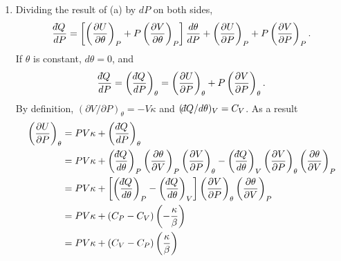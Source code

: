 \documentclass[a4paper,12pt]{article}
\def\dbar{{\mathchar'26\mkern-12mu d}}
\begin{document}
\begin{enumerate}
\begin{enumerate}
            \item
                Dividing the result of (a) by $dP$ on both sides,
                \begin{align*}
                    \frac{\dbar Q}{dP} &= \left[ \left( \frac{\partial U}{\partial \theta} \right)_P + P \left( \frac{\partial V}{\partial \theta} \right)_P \right] \frac{d\theta}{dP} + \left( \frac{\partial U}{\partial P} \right)_P + P \left( \frac{\partial V}{\partial P} \right)_P. \\
                \end{align*}
                If $\theta$ is constant, $d\theta = 0$, and
                \begin{align*}
                    \frac{\dbar Q}{dP} = \left( \frac{\dbar Q}{dP} \right)_\theta &= \left( \frac{\partial U}{\partial P} \right)_\theta + P \left( \frac{\partial V}{\partial P} \right)_\theta. \\
                \end{align*}
                By definition, $(\partial V / \partial P)_\theta = -V \kappa$ and $(\dbar Q / d \theta)_V = C_V$. As a result
                \begin{align*}
                    \left( \frac{\partial U}{\partial P} \right)_\theta &= PV\kappa + \left( \frac{\dbar Q}{dP} \right)_\theta \\
                    &= PV\kappa + \left( \frac{\dbar Q}{d\theta} \right)_P \left( \frac{\partial \theta}{\partial V} \right)_P \left( \frac{\partial V}{\partial P} \right)_\theta - \left( \frac{\dbar Q}{d\theta} \right)_V \left( \frac{\partial V}{\partial P} \right)_\theta \left( \frac{\partial \theta}{\partial V} \right)_P \\
                    &= PV\kappa + \left[ \left( \frac{\dbar Q}{d\theta} \right)_P - \left( \frac{\dbar Q}{d\theta} \right)_V \right] \left( \frac{\partial V}{\partial P} \right)_\theta \left( \frac{\partial \theta}{\partial V} \right)_P \\
                    &= PV\kappa + (C_P - C_V) \left(-\frac{\kappa}{\beta} \right) \\
                    &= PV\kappa + (C_V - C_P) \left(\frac{\kappa}{\beta} \right) \\
                \end{align*}
        \end{enumerate}


\end{enumerate}
\end{document}
